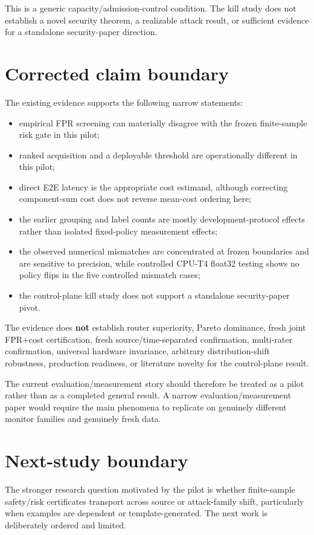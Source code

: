 \documentclass[11pt]{article}
\begin{document}
This is a generic capacity/admission-control condition. The kill study does not establish a novel security theorem, a realizable attack result, or sufficient evidence for a standalone security-paper direction.

\section{Corrected claim boundary}
The existing evidence supports the following narrow statements:
\begin{itemize}
    \item empirical FPR screening can materially disagree with the frozen finite-sample risk gate in this pilot;
    \item ranked acquisition and a deployable threshold are operationally different in this pilot;
    \item direct E2E latency is the appropriate cost estimand, although correcting component-sum cost does not reverse mean-cost ordering here;
    \item the earlier grouping and label counts are mostly development-protocol effects rather than isolated fixed-policy measurement effects;
    \item the observed numerical mismatches are concentrated at frozen boundaries and are sensitive to precision, while controlled CPU-T4 float32 testing shows no policy flips in the five controlled mismatch cases;
    \item the control-plane kill study does not support a standalone security-paper pivot.
\end{itemize}

The evidence does \textbf{not} establish router superiority, Pareto dominance, fresh joint FPR+cost certification, fresh source/time-separated confirmation, multi-rater confirmation, universal hardware invariance, arbitrary distribution-shift robustness, production readiness, or literature novelty for the control-plane result.

The current evaluation/measurement story should therefore be treated as a pilot rather than as a completed general result. A narrow evaluation/measurement paper would require the main phenomena to replicate on genuinely different monitor families and genuinely fresh data.

\section{Next-study boundary}
The stronger research question motivated by the pilot is whether finite-sample safety/risk certificates transport across source or attack-family shift, particularly when examples are dependent or template-generated. The next work is deliberately ordered and limited.
\end{document}
